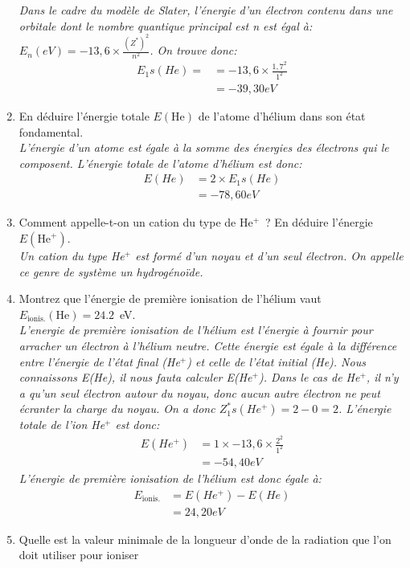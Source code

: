 \begin{enumerate}[\bf 1)]
\textsl{%
Dans le cadre du modèle de Slater, l'énergie d'un électron contenu dans une orbitale dont le
nombre quantique principal est n est égal à: $E_n (eV)= -13,6 \times \frac{(Z^*)^2}{n^2}$.
On trouve donc:
\begin{align*}
E_1s(He) = &= -13,6 \times \frac{1,7^2}{1^2}\\
           &= -39,30 eV
\end{align*}
}
\item En d\'eduire l'\'energie totale $E(\textrm{He})$ de l'atome d'h\'elium dans son \'etat fondamental.\\
\textsl{%
L'énergie d'un atome est égale à la somme des énergies des électrons qui le composent.
L'énergie totale de l'atome d'hélium est donc:
\begin{align*}
E(He) &= 2\times E_1s(He)\\
      &= -78,60 eV
\end{align*}
}
\item Comment appelle-t-on un cation du type de He$^+$~?  En d\'eduire l'\'energie $E(\textrm{He}^+)$.\\
\textsl{%
Un cation du type He$^+$ est formé d'un noyau et d'un seul électron.
On appelle ce genre de système un hydrogénoïde.
}
\item Montrez que l'\'energie de premi\`ere ionisation de l'h\'elium vaut $E_\textrm{ionis.}(\textrm{He})=24.2$~eV.\\
\textsl{%
L'energie de première ionisation de l'hélium est l'énergie à fournir pour arracher un
électron à l'hélium neutre.
Cette énergie est égale à la différence entre l'énergie de l'état final (He$^+$)
et celle de l'état initial (He).
Nous connaissons E(He), il nous fauta calculer E(He$^+$).
Dans le cas de He$^+$, il n'y a qu'un seul électron autour du noyau, donc aucun autre électron ne
peut écranter la charge du noyau. On a donc $Z^*_1s(He^+)= 2 - 0 = 2$.
L'énergie totale de l'ion He$^+$ est donc:
\begin{align*}
E(He^+) &= 1\times -13,6 \times \frac{2^2}{1^2}\\
        &= -54,40 eV
\end{align*}
L'énergie de première ionisation de l'hélium est donc égale à:
\begin{align*}
E_\text{ionis.} &= E(He^+) - E(He)\\
                &= 24,20 eV
\end{align*}
}
\item Quelle est la valeur minimale de la longueur d'onde de la radiation que l'on doit utiliser pour ioniser 

\end{enumerate}
